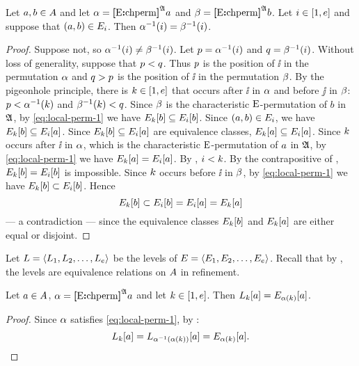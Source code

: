\begin{remark}\label{rem:local-inv-perm}
Let $a, b \in A$ and let
$\alpha = {\bm{[}{\mathrm{E}}\mathord{\bm{:}}\mathrm{chperm}\bm{]}}^{\mathfrak{A}}a$ and $\beta = {\bm{[}{\mathrm{E}}\mathord{\bm{:}}\mathrm{chperm}\bm{]}}^{\mathfrak{A}}b$.
Let $i \in [1,e]$ and suppose that $(a, b) \in E_{i}$.
Then $\alpha^{-1}(i) = \beta^{-1}(i)$.
\end{remark}
\begin{proof}
Suppose not, so $\alpha^{-1}(i) \neq \beta^{-1}(i)$.
Let $p = \alpha^{-1}(i)$ and $q = \beta^{-1}(i)$.
Without loss of generality, suppose that $p < q$.
Thus $p$ is the position of $\ii$ in the permutation $\alpha$ and 
$q > p$ is the position of $\ii$ in the permutation $\beta$. 
By the pigeonhole principle, there is $k \in [1,e]$ that occurs after $\ii$
in $\alpha$ and before $\jj$ in $\beta$:
$p < \alpha^{-1}(k)$ and $\beta^{-1}(k) < q$.
Since $\beta$ is the characteristic ${\mathrm{E}}$-permutation of $b$ in $\mathfrak{A}$, by
\cref{eq:local-perm-1} we have $E_{k}[b] \subseteq E_{i}[b]$.
Since $(a, b) \in E_{i}$, we have $E_{k}[b] \subseteq
E_{i}[a]$.
Since $E_{k}[b] \subseteq E_{i}[a]$ are equivalence classes,
$E_{k}[a] \subseteq E_{i}[a]$.
Since $k$ occurs after $\ii$ in $\alpha$, which is the characteristic
${\mathrm{E}}$-permutation of $a$ in $\mathfrak{A}$, 
by \cref{eq:local-perm-1} we have $E_{k}[a] = E_{i}[a]$.
By , $i < k$.
By the contrapositive of ,
$E_{k}[b] = E_{i}[b]$ is impossible.
Since $k$ occurs before $\ii$ in $\beta$, 
by \cref{eq:local-perm-1} we have $E_{k}[b] \subset E_{i}[b]$.
Hence
\[
  E_{k}[b] \subset E_{i}[b] = E_{i}[a] = E_{k}[a]
\]
--- a contradiction --- since the equivalence classes $E_{k}[b]$ and
$E_{k}[a]$ are either equal or disjoint.
\end{proof}

Let
$L = \left\langle L_{1},L_{2},\dots,L_{e} \right\rangle$ be the levels of
$E = \left\langle E_{1}, E_{2}, \dots, E_{e} \right\rangle$.
Recall that by , the levels are equivalence relations
on $A$ in refinement.

\begin{remark}\label{rem:local-lvl-perm}
Let $a \in A$, $\alpha = {\bm{[}{\mathrm{E}}\mathord{\bm{:}}\mathrm{chperm}\bm{]}}^{\mathfrak{A}}a$ and let $k \in [1,e]$.
Then $L_{k}[a] = E_{\alpha(k)}[a]$.
\end{remark}
\begin{proof}
Since $\alpha$ satisfies \cref{eq:local-perm-1}, by :
\[
  L_{k}[a] = 
  L_{\alpha^{-1}(\alpha(k))}[a] =
  E_{\alpha(k)}[a].
\]
\end{proof}

